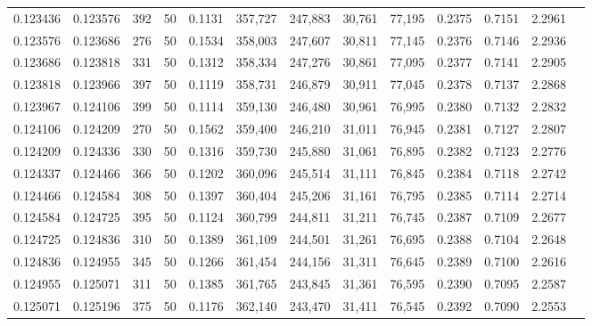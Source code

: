 \begin{tabular}{rrrrrrrrrrrrr}
0.123436 & 0.123576 &   392 &  50 &                                     0.1131 & 357,727 & 247,883 &  30,761 &  77,195 & 0.2375 & 0.7151 & 2.2961 \\
0.123576 & 0.123686 &   276 &  50 &                                     0.1534 & 358,003 & 247,607 &  30,811 &  77,145 & 0.2376 & 0.7146 & 2.2936 \\
0.123686 & 0.123818 &   331 &  50 &                                     0.1312 & 358,334 & 247,276 &  30,861 &  77,095 & 0.2377 & 0.7141 & 2.2905 \\
0.123818 & 0.123966 &   397 &  50 &                                     0.1119 & 358,731 & 246,879 &  30,911 &  77,045 & 0.2378 & 0.7137 & 2.2868 \\
0.123967 & 0.124106 &   399 &  50 &                                     0.1114 & 359,130 & 246,480 &  30,961 &  76,995 & 0.2380 & 0.7132 & 2.2832 \\
0.124106 & 0.124209 &   270 &  50 &                                     0.1562 & 359,400 & 246,210 &  31,011 &  76,945 & 0.2381 & 0.7127 & 2.2807 \\
0.124209 & 0.124336 &   330 &  50 &                                     0.1316 & 359,730 & 245,880 &  31,061 &  76,895 & 0.2382 & 0.7123 & 2.2776 \\
0.124337 & 0.124466 &   366 &  50 &                                     0.1202 & 360,096 & 245,514 &  31,111 &  76,845 & 0.2384 & 0.7118 & 2.2742 \\
0.124466 & 0.124584 &   308 &  50 &                                     0.1397 & 360,404 & 245,206 &  31,161 &  76,795 & 0.2385 & 0.7114 & 2.2714 \\
0.124584 & 0.124725 &   395 &  50 &                                     0.1124 & 360,799 & 244,811 &  31,211 &  76,745 & 0.2387 & 0.7109 & 2.2677 \\
0.124725 & 0.124836 &   310 &  50 &                                     0.1389 & 361,109 & 244,501 &  31,261 &  76,695 & 0.2388 & 0.7104 & 2.2648 \\
0.124836 & 0.124955 &   345 &  50 &                                     0.1266 & 361,454 & 244,156 &  31,311 &  76,645 & 0.2389 & 0.7100 & 2.2616 \\
0.124955 & 0.125071 &   311 &  50 &                                     0.1385 & 361,765 & 243,845 &  31,361 &  76,595 & 0.2390 & 0.7095 & 2.2587 \\
0.125071 & 0.125196 &   375 &  50 &                                     0.1176 & 362,140 & 243,470 &  31,411 &  76,545 & 0.2392 & 0.7090 & 2.2553 \\

\end{tabular}
